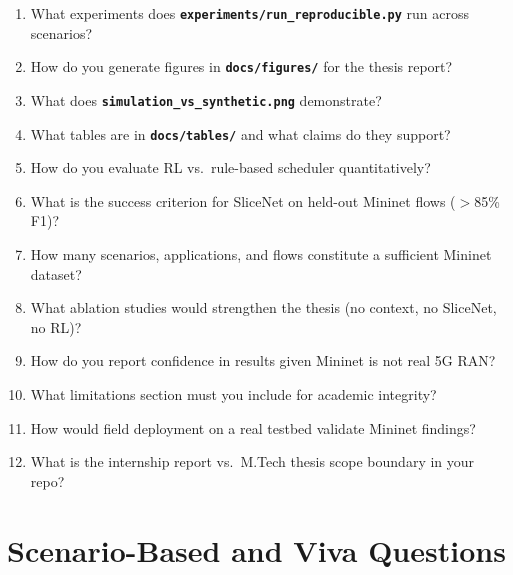 \documentclass[11pt,a4paper]{article}
\newcommand{\proj}[1]{\textbf{\texttt{#1}}}
\begin{document}
\begin{enumerate}
    \item What experiments does \proj{experiments/run\_reproducible.py} run across scenarios?
    \item How do you generate figures in \proj{docs/figures/} for the thesis report?
    \item What does \proj{simulation\_vs\_synthetic.png} demonstrate?
    \item What tables are in \proj{docs/tables/} and what claims do they support?
    \item How do you evaluate RL vs.\ rule-based scheduler quantitatively?
    \item What is the success criterion for SliceNet on held-out Mininet flows ($>$85\% F1)?
    \item How many scenarios, applications, and flows constitute a sufficient Mininet dataset?
    \item What ablation studies would strengthen the thesis (no context, no SliceNet, no RL)?
    \item How do you report confidence in results given Mininet is not real 5G RAN?
    \item What limitations section must you include for academic integrity?
    \item How would field deployment on a real testbed validate Mininet findings?
    \item What is the internship report vs.\ M.Tech thesis scope boundary in your repo?
\end{enumerate}

\section{Scenario-Based and Viva Questions}
\end{document}
